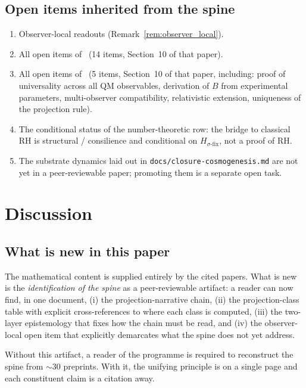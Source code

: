 \documentclass[12pt]{article}
\begin{document}
\subsection{Open items inherited from the spine}

\begin{enumerate}
    \item Observer-local readouts (Remark~\ref{rem:observer_local}).
    \item All open items of~\citep{SmartXXXII} (14 items, Section~10 of that paper).
    \item All open items of~\citep{SmartXXXIII} (5 items, Section~10 of that paper, including: proof of universality across all QM observables, derivation of $B$ from experimental parameters, multi-observer compatibility, relativistic extension, uniqueness of the projection rule).
    \item The conditional status of the number-theoretic row: the bridge to classical RH is structural / consilience and conditional on $H_{\sigma\text{-fix}}$, not a proof of RH.
    \item The substrate dynamics laid out in \texttt{docs/closure-cosmogenesis.md} are not yet in a peer-reviewable paper; promoting them is a separate open task.
\end{enumerate}

\section{Discussion}\label{sec:discussion}

\subsection{What is new in this paper}

The mathematical content is supplied entirely by the cited papers. What is new is the \emph{identification of the spine} as a peer-reviewable artifact: a reader can now find, in one document, (i) the projection-narrative chain, (ii) the projection-class table with explicit cross-references to where each class is computed, (iii) the two-layer epistemology that fixes how the chain must be read, and (iv) the observer-local open item that explicitly demarcates what the spine does not yet address.

Without this artifact, a reader of the programme is required to reconstruct the spine from $\sim 30$ preprints. With it, the unifying principle is on a single page and each constituent claim is a citation away.
\end{document}
